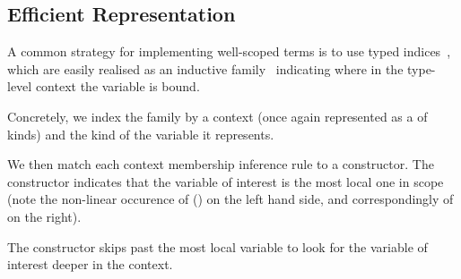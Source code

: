 \subsection{Efficient \DeBruijn{} Representation}
\label{sec:design:deBruijn}

A common strategy for implementing well-scoped terms is to use typed
\emph{\DeBruijn{}} indices~\cite{MANUAL:journals/math/debruijn72},
which are easily realised as an inductive family~\cite{DBLP:journals/fac/Dybjer94}
indicating where in the type-level context the variable is bound.

Concretely, we index the  family by a context
(once again represented as a  of kinds) and
the kind of the variable it represents.

\begin{center}
\begin{minipage}{0.10\textwidth}
\varRule
\end{minipage}\hfill
\begin{minipage}{0.80\textwidth}
\end{minipage}
\end{center}

We then match each context membership inference rule to a constructor.
%
The  constructor indicates that the variable of interest is
the most local one in scope (note the non-linear occurence of () on
the left hand side, and correspondingly of  on the right).

\begin{center}
\begin{minipage}{0.35\textwidth}
  \varZero
\end{minipage}\hfill
\begin{minipage}{0.55\textwidth}
\end{minipage}
\end{center}

The  constructor skips past the most local variable to look for the variable of interest deeper in the context.

\begin{center}
\begin{minipage}{0.35\textwidth}
  \varSuc
\end{minipage}\hfill
\begin{minipage}{0.55\textwidth}
\end{minipage}
\end{center}


